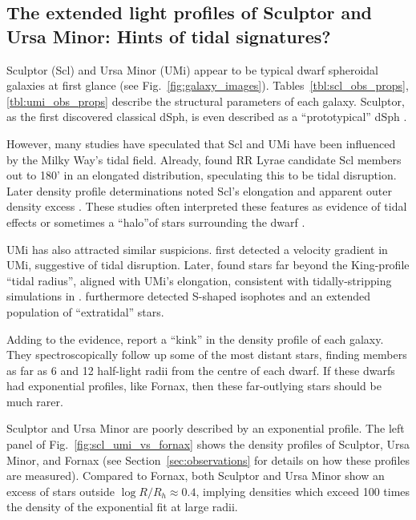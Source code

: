 \subsection{The extended light profiles of Sculptor and Ursa Minor:
Hints of tidal signatures?}\label{sec:scl_umi_obs_tides}

Sculptor (Scl) and Ursa Minor (UMi) appear to be typical dwarf
spheroidal galaxies at first glance (see Fig.~\ref{fig:galaxy_images}).
Tables~\ref{tbl:scl_obs_props}, \ref{tbl:umi_obs_props} describe the
structural parameters of each galaxy. Sculptor, as the first discovered
classical dSph, is even described as a ``prototypical'' dSph
\citep[e.g.,][]{mcconnachie2012}.

However, many studies have speculated that Scl and UMi have been
influenced by the Milky Way's tidal field. Already,
\citet{innanen+papp1979} found RR Lyrae candidate Scl members
\citep[from][]{vanagt1978} out to 180' in an elongated distribution,
speculating this to be tidal disruption. Later density profile
determinations noted Scl's elongation and apparent outer density excess
\citetext{\citealp{eskridge1988}; \citealp{IH1995}; \citealp{walcher+2003}; \citealp{westfall+2006}; \citealp[but
see also][]{coleman+dacosta+bland-hawthorn2005}}. These studies often
interpreted these features as evidence of tidal effects
\citep[e.g.,][]{walcher+2003} or sometimes a ``halo''of stars
surrounding the dwarf \citep{westfall+2006}.

UMi has also attracted similar suspicions. \citet{hargreaves+1994} first
detected a velocity gradient in UMi, suggestive of tidal disruption.
Later, \citet{martinez-delgado+2001} found stars far beyond the
King-profile ``tidal radius'', aligned with UMi's elongation, consistent
with tidally-stripping simulations in
\citet{gomez-flechoso+martinez-delgado2003}. \citet{palma+2003}
furthermore detected S-shaped isophotes and an extended population of
``extratidal'' stars.

Adding to the evidence, \citet{sestito+2023a, sestito+2023b} report a
``kink'' in the density profile of each galaxy. They spectroscopically
follow up some of the most distant stars, finding members as far as 6
and 12 half-light radii from the centre of each dwarf. If these dwarfs
had exponential profiles, like Fornax, then these far-outlying stars
should be much rarer.

Sculptor and Ursa Minor are poorly described by an exponential profile.
The left panel of Fig.~\ref{fig:scl_umi_vs_fornax} shows the density
profiles of Sculptor, Ursa Minor, and Fornax (see
Section~\ref{sec:observations} for details on how these profiles are
measured). Compared to Fornax, both Sculptor and Ursa Minor show an
excess of stars outside \(\log R/R_h\approx 0.4\), implying densities
which exceed 100 times the density of the exponential fit at large
radii.

